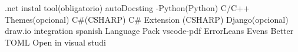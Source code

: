 .net instal tool(obligatorio)
autoDocsting -Python(Python)
C/C++ Themes(opcional)
C#(CSHARP)
C# Extension (CSHARP)
Django(opcional)
draw.io integration
spanish Language Pack
vscode-pdf
ErrorLeans
Evens Better TOML
Open in visual studi